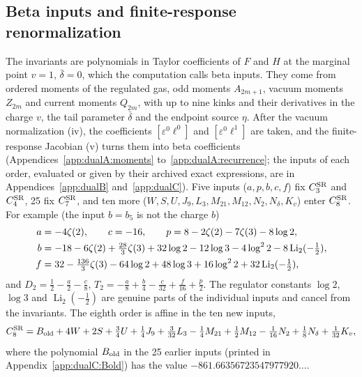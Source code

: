 \documentclass[11pt,a4paper]{article}
\numberwithin{equation}{section}
\newcommand{\CSR}{C^{\rm SR}}
\newcommand{\db}{\bar\delta}
\newcommand{\Li}{\operatorname{Li}}
\begin{document}
\subsection{Beta inputs and finite-response renormalization}\label{sec:inputs1}
The invariants are polynomials in Taylor coefficients of $F$ and $H$ at the marginal point $v=1$, $\db=0$, which
the computation calls beta inputs. They come from ordered moments of the regulated gas, odd moments $A_{2m+1}$,
vacuum moments $Z_{2m}$ and current moments $Q_{2m}$, with up to nine kinks and their derivatives in the charge $v$,
the tail parameter $\db$ and the endpoint source $\eta$. After the vacuum normalization (iv), the coefficients
$[\varepsilon^0\ell^0]$ and $[\varepsilon^0\ell^1]$ are taken, and the finite-response Jacobian (v) turns them into
beta coefficients (Appendices~\ref{app:dualA:moments} to~\ref{app:dualA:recurrence}; the inputs of each order,
evaluated or given by their archived exact expressions, are in Appendices~\ref{app:dualB} and~\ref{app:dualC}). Five inputs ($a,p,b,c,f$) fix $\CSR_3$ and $\CSR_4$, 25 fix $\CSR_7$, and ten more
($W,S,U,J_9,L_3,M_{21},M_{12},N_2,N_\delta,K_v$) enter $\CSR_8$. For example (the input $b=b_5$ is not the charge $b$)
\begin{align}
 a&=-4\zeta(2),\qquad c=-16,\qquad p=8-2\zeta(2)-7\zeta(3)-8\log2,\notag\\
 b&=-18-6\zeta(2)+\tfrac{28}{3}\zeta(3)+32\log2-12\log3-4\log^22-8\Li_2(-\tfrac12),\\
 f&=32-\tfrac{136}{3}\zeta(3)-64\log2+48\log3+16\log^22+32\Li_2(-\tfrac12),\notag
\end{align}
and $D_2=\frac12-\frac a2-\frac c8$, $T_2=-\frac a8+\frac b4-\frac c{32}+\frac f{16}+\frac p2$. The regulator
constants $\log2$, $\log3$ and $\Li_2(-\frac12)$ are genuine parts of the individual inputs and cancel from the
invariants. The eighth order is affine in the ten new inputs,
\begin{equation}
 \CSR_8=B_{\rm old}+4W+2S+\tfrac34U+\tfrac14J_9+\tfrac3{32}L_3-\tfrac14M_{21}+\tfrac12M_{12}-\tfrac1{16}N_2
 +\tfrac18N_\delta+\tfrac1{32}K_v,
 \label{eq:C8assembly}
\end{equation}
where the polynomial $B_{\rm old}$ in the 25 earlier inputs (printed in Appendix~\ref{app:dualC:Bold}) has the value
$-861.66356723547977920\ldots$.
\end{document}
